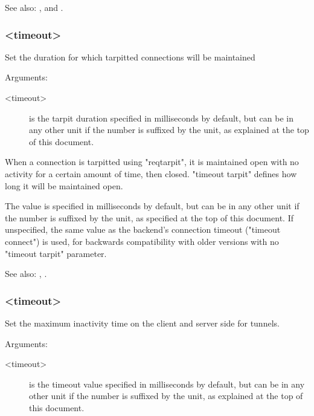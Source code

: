 See also: ,  and .

\subsubsection[timeout tarpit]{ <timeout>}

  Set the duration for which tarpitted connections will be maintained


  Arguments:
  \begin{description}
  \item[<timeout>] is the tarpit duration specified in milliseconds by default, but
              can be in any other unit if the number is suffixed by the unit,
              as explained at the top of this document.
  \end{description}

  When a connection is tarpitted using "reqtarpit", it is maintained open with
  no activity for a certain amount of time, then closed. "timeout tarpit"
  defines how long it will be maintained open.

  The value is specified in milliseconds by default, but can be in any other
  unit if the number is suffixed by the unit, as specified at the top of this
  document. If unspecified, the same value as the backend's connection timeout
  ("timeout connect") is used, for backwards compatibility with older versions
  with no "timeout tarpit" parameter.


See also: , .

\subsubsection[timeout tunnel]{ <timeout>}

  Set the maximum inactivity time on the client and server side for tunnels.


  Arguments:
  \begin{description}
  \item[<timeout>] is the timeout value specified in milliseconds by default, but
              can be in any other unit if the number is suffixed by the unit,
              as explained at the top of this document.
  \end{description}

